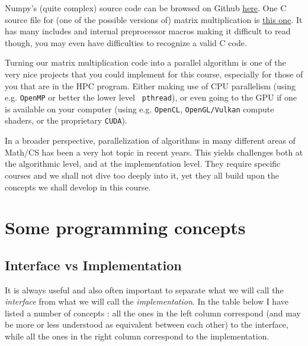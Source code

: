 \documentclass[12pt]{article}
\theoremstyle{plain}
\theoremstyle{remark}
\begin{document}
Numpy's (quite complex) source code can be browsed on Github 
\href{https://github.com/numpy/numpy/tree/main}{here}. One C source
file for (one of the possible versions of) matrix multiplication is
\href{https://github.com/numpy/numpy/blob/main/numpy/_core/src/umath/matmul.c.src}{this
one}. It has many includes and internal preprocessor macros making it difficult 
to read though, you may even have difficulties to recognize a valid C code.   

\medskip

Turning our matrix multiplication code into a parallel algorithm is one of the
very nice projects that you could implement for this course, especially for
those of you that are in the HPC program. Either making use of
CPU parallelism (using e.g. {\tt OpenMP} or better the lower level {\tt
pthread}), or even going to the GPU if one is 
available on your computer (using e.g. {\tt OpenCL}, {\tt OpenGL/Vulkan} 
compute shaders, or the proprietary {\tt CUDA}).

\medskip

In a broader perspective, parallelization of algorithms in many different areas
of Math/CS has been a very hot topic in recent years. This yields challenges both at the
algorithmic level, and at the implementation level. They require specific courses 
and we shall not dive too deeply into it, yet they all build upon the concepts
we shall develop in this course.


\pagebreak
\section{Some programming concepts}

\subsection{Interface vs Implementation}

It is always useful and also often important to separate what we will call the 
{\it interface} from what we will call the {\it implementation}. In the table
below I have listed a number of concepts : all the ones in the left column
correspond (and may be more or less understood as equivalent between each
other) to the interface, while all the ones in the right column correspond to
the implementation.
\end{document}
